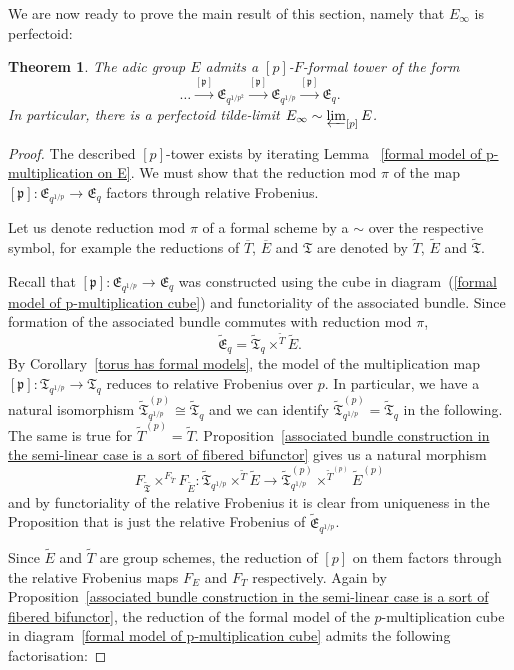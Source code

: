 \documentclass[10pt,oneside]{amsart}
\newtheorem{theorem}{Theorem}[section]
\theoremstyle{definition}
\begin{document}
	We are now ready to prove the main result of this section, namely that $E_\infty$ is perfectoid:
	\begin{theorem}\label{p-F-formal tower exists for E}
		The adic group $E$ admits a $[p]$-$F$-formal tower of the form
		\[\dots \xrightarrow{[\mathfrak p]} \mathfrak E_{q^{1/p^2}}\xrightarrow{[\mathfrak p]} \mathfrak E_{q^{1/p}}\xrightarrow{[\mathfrak p]} \mathfrak E_q.\]
		In particular, there is a perfectoid tilde-limit $E_\infty\sim \varprojlim_{[p]}E$.
	\end{theorem}
	\begin{proof}
	The described $[p]$-tower exists by iterating Lemma ~\ref{formal model of p-multiplication on E}.
	We must show that the reduction mod $\pi$ of the map $[\mathfrak p]:\mathfrak E_{q^{1/p}}\xrightarrow{} \mathfrak E_q$ factors through relative Frobenius.
	
	Let us denote reduction mod $\pi$ of a formal scheme by a $\sim$ over the respective symbol, for example the reductions of $\overline{T}$, $\overline{E}$ and $\mathfrak T$ are denoted by $\tilde{T}$, $\tilde{E}$ and $\tilde{\mathfrak{T}}$.
	
		
	Recall that $[\mathfrak p]:\mathfrak E_{q^{1/p}}\xrightarrow{} \mathfrak E_q$ was constructed using the cube in diagram~(\ref{formal model of p-multiplication cube}) and functoriality of the associated bundle. 	
	Since formation of the associated bundle commutes with reduction mod $\pi$,
	\[\tilde{\mathfrak{E}}_q = \tilde{\mathfrak T}_q\times^{\tilde{T}}\tilde E.\]
	By  Corollary~\ref{torus has formal models}, the model of the multiplication map $[\mathfrak p]:\mathfrak T_{q^{1/p}} \rightarrow \mathfrak T_{q}$ reduces to relative Frobenius over $p$. In particular, we have a natural isomorphism $\tilde{\mathfrak T}_{q^{1/p}}^{(p)} \cong \tilde{\mathfrak T}_{q}$
	and we can identify $\tilde{\mathfrak T}_{q^{1/p}}^{(p)} = \tilde{\mathfrak T}_{q}$ in the following. The same is true for $\tilde{T}^{(p)} = \tilde{T}$. Proposition~\ref{associated bundle construction in the semi-linear case is a sort of fibered bifunctor} gives us a natural morphism
	\[F_{\tilde{\mathfrak{T}}}\times^{F_{\tilde{T}}} F_{\tilde
		E}:\tilde{\mathfrak T}_{q^{1/p}}\times^{\tilde T}\tilde E \rightarrow \tilde{\mathfrak T}_{q^{1/p}}^{(p)}\times^{\tilde T^{(p)}}\tilde E^{(p)} \]
	and by functoriality of the relative Frobenius it is clear from uniqueness in the Proposition that is just the relative Frobenius of $\tilde{\mathfrak{E}}_{q^{1/p}}$. 
	
	
	Since $\tilde{E}$ and $\tilde{T}$ are group schemes, the reduction of $[p]$ on them factors through the relative Frobenius maps $F_E$ and $F_T$ respectively. Again by Proposition~\ref{associated bundle construction in the semi-linear case is a sort of fibered bifunctor}, the reduction of the formal model of the $p$-multiplication cube in diagram~\eqref{formal model of p-multiplication cube} admits the following factorisation:
	

\end{proof}
\end{document}
